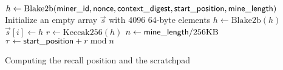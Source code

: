 \begin{algorithm}
	\small
	\SetNlSty{}{}{}
	\DontPrintSemicolon
	$h\leftarrow \textrm{Blake2b}({\sf miner\_id}, {\sf nonce}, {\sf context\_digest}, {\sf start\_position}, {\sf mine\_length})$\;
	Initialize an empty array $\vec{s}$ with 4096 64-byte elements\;
	{
		$h\leftarrow \textrm{Blake2b}(h)$\;
		$\vec{s}[i]\leftarrow h$\;
	}
	$r \leftarrow \textrm{Keccak256}(h)$\; 
	$n\leftarrow {\sf mine\_length}/256\mathrm{KB}$\;
	$\tau \leftarrow {\sf start\_position} + r \;\text{mod}\; n$
	\caption{Computing the recall position and the scratchpad}
	\label{fig:recall}
	\vspace{-4mm}
\end{algorithm}





